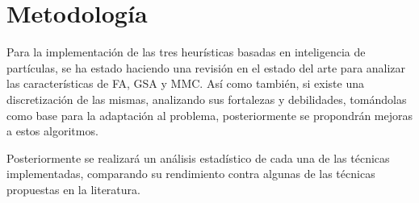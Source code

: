 \documentclass[letterpaper,10pt]{article}
\begin{document}
\section{Metodología}

Para la implementación de las tres heurísticas basadas en inteligencia de partículas, se ha estado haciendo una revisión en el estado del arte para analizar las características de FA, GSA y MMC.  Así como también, si existe una discretización  de las mismas, analizando sus fortalezas y debilidades, tomándolas  como  base para la adaptación al problema, posteriormente se propondrán mejoras a estos algoritmos.
 
Posteriormente se realizará un análisis estadístico de cada una de las técnicas implementadas, comparando su rendimiento contra algunas de las  técnicas propuestas en la literatura.
 
\end{document}
